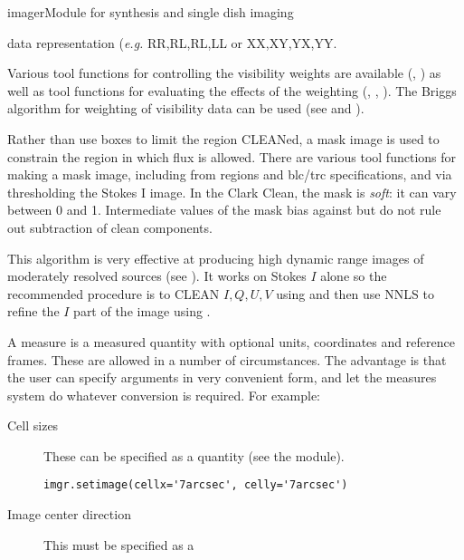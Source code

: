 \begin{ahmodule}{imager}{Module for synthesis and single dish imaging}
\begin{description}
data representation ({\em e.g.} RR,RL,RL,LL or XX,XY,YX,YY. 
\item[Fine control and evaluation of visibility weighting] Various
tool functions for controlling the visibility weights are available
(, ) 
as well as tool functions for evaluating the effects of the weighting
(,
,
).  The Briggs algorithm for 
weighting of visibility data can be used (see
 and  {\briggsURL}).
\item[Flexible windowing in the deconvolution] Rather than use boxes
to limit the region CLEANed, a mask image is used to constrain the
region in which flux is allowed. There are various tool functions for making
a mask image, including from regions and blc/trc specifications, and via
thresholding the Stokes I image. In the Clark Clean, the mask is
{\em soft}: it can vary between 0 and 1. Intermediate values of
the mask bias against but do not rule out subtraction of clean components.
\item[Non-Negative Least Squares Deconvolution] This algorithm
is very effective at producing high dynamic range images of moderately
resolved sources (see 
{\briggsURL}). It works on Stokes $I$ alone so the recommended
procedure is to CLEAN $I,Q,U,V$ using 
and then use NNLS to refine the $I$ part of the image using
.
\item[Specification of arguments as] A measure 
is a measured quantity with optional units, coordinates and reference
frames. These are allowed in a number of circumstances.  The advantage
is that the user can specify arguments in very convenient form, and
let the measures system do whatever conversion is required. For
example:
\begin{description}
\item[Cell sizes] These can be specified as a quantity (see the 
 module).
\begin{verbatim}
imgr.setimage(cellx='7arcsec', celly='7arcsec')
\end{verbatim}
\item[Image center direction] This must be specified as a 

\end{description}
\end{description}
\end{ahmodule}
